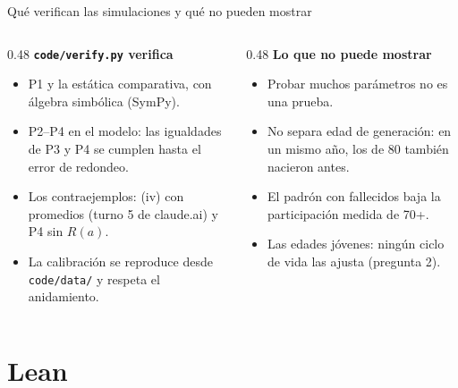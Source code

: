\documentclass[aspectratio=169,11pt,xcolor=table]{beamer}
\newcommand{\1}{\mathbbm{1}}
\begin{document}
\begin{frame}{Qué verifican las simulaciones y qué no pueden mostrar}
  \begin{columns}[T]
    \begin{column}{0.48\textwidth}
      {\color{upblue}\bfseries \texttt{code/verify.py} verifica}
      \begin{itemize}\setlength{\itemsep}{0.4em}\small
        \item P1 y la estática comparativa, con álgebra simbólica (SymPy).
        \item P2--P4 en el modelo: las igualdades de P3 y P4 se cumplen hasta el error de redondeo.
        \item Los contraejemplos: (iv) con promedios (turno 5 de claude.ai) y P4 sin $R(a)$.
        \item La calibración se reproduce desde \texttt{code/data/} y respeta el anidamiento.
      \end{itemize}
    \end{column}
    \begin{column}{0.48\textwidth}
      {\color{upred}\bfseries Lo que no puede mostrar}
      \begin{itemize}\setlength{\itemsep}{0.4em}\small
        \item Probar muchos parámetros no es una prueba.
        \item No separa edad de generación: en un mismo año, los de 80 también nacieron antes.
        \item El padrón con fallecidos baja la participación medida de 70+.
        \item Las edades jóvenes: ningún ciclo de vida las ajusta (pregunta 2).
      \end{itemize}
    \end{column}
  \end{columns}
\end{frame}

\section[6 Lean]{Lean}
\end{document}
